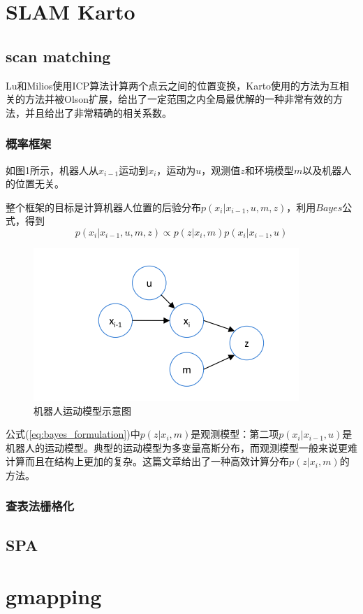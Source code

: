 \documentclass{article}
\begin{document}
\tableofcontents
\newpage

\section{SLAM Karto}
\subsection{scan matching}
Lu和Milios使用ICP算法计算两个点云之间的位置变换，Karto使用的方法为互相关的方法并被Olson扩展，给出了一定范围之内全局最优解的一种非常有效的方法，并且给出了非常精确的相关系数。
\subsubsection{概率框架}
如图1所示，机器人从$x_{i-1}$运动到$x_i$，运动为$u$，观测值$z$和环境模型$m$以及机器人的位置无关。

整个框架的目标是计算机器人位置的后验分布$p(x_i|x_{i-1},u,m,z)$，利用$Bayes$公式，得到
\begin{equation}
	p(x_i |x_{i-1},u,m,z)\propto p(z|x_i, m)p(x_i|x_{i-1},u)
	\label{eq:bayes_formulation}
\end{equation}

\begin{figure}[h]
	\includegraphics{images/motion_model.png}
	\caption{机器人运动模型示意图}
\end{figure}

公式(\ref{eq:bayes_formulation})中$p(z|x_i,m)$是观测模型：第二项$p(x_i|x_{i-1},u)$是机器人的运动模型。典型的运动模型为多变量高斯分布，而观测模型一般来说更难计算而且在结构上更加的复杂。这篇文章给出了一种高效计算分布$p(z|x_i,m)$的方法。

\subsubsection{查表法栅格化}


\subsection{SPA}


\section{gmapping}
\subsection{}
\end{document}

